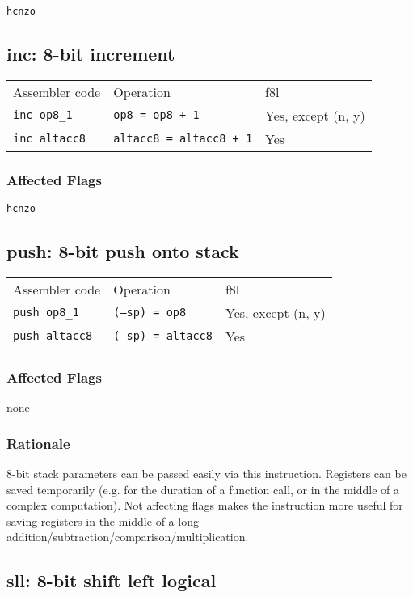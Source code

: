 \documentclass{book}
\begin{document}
\texttt{hcnzo}


\subsection{inc: 8-bit increment}

\begin{tabular}{l l l}
Assembler code       & Operation                      & f8l \\
\texttt{inc op8\_1}  & \texttt{op8 = op8 + 1}         & Yes, except (n, y) \\
\texttt{inc altacc8} & \texttt{altacc8 = altacc8 + 1} & Yes
\end{tabular}

\subsubsection*{Affected Flags}

\texttt{hcnzo}


\subsection{push: 8-bit push onto stack}

\begin{tabular}{l l l}
Assembler code        & Operation                 & f8l \\
\texttt{push op8\_1}  & \texttt{(--sp) = op8}     & Yes, except (n, y) \\
\texttt{push altacc8} & \texttt{(--sp) = altacc8} & Yes
\end{tabular}

\subsubsection*{Affected Flags}

none

\subsubsection*{Rationale}

8-bit stack parameters can be passed easily via this instruction. Registers can be saved temporarily (e.g. for the duration of a function call, or in the middle of a complex computation). Not affecting flags makes the instruction more useful for saving registers in the middle of a long addition/subtraction/comparison/multiplication.


\subsection{sll: 8-bit shift left logical}
\end{document}
